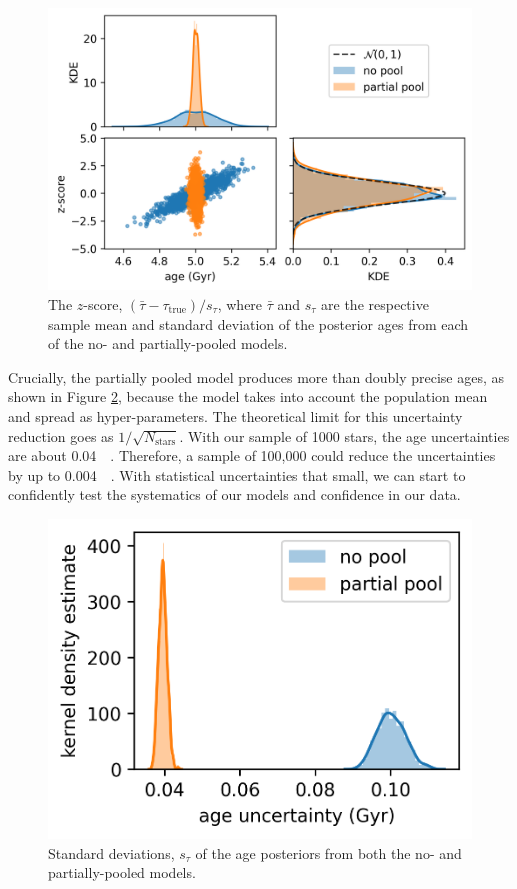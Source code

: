 \begin{figure}[t]
    \centering
    \includegraphics[]{introduction/images/age_z_score.png}
    \caption{The $z$-score, $(\bar{\tau} - \tau_\mathrm{true}) / s_\tau$, where $\bar{\tau}$ and $s_\tau$ are the respective sample mean and standard deviation of the posterior ages from each of the no- and partially-pooled models.}
    \label{fig:zscore}
\end{figure}

Crucially, the partially pooled model produces more than doubly precise ages, as shown in Figure \ref{fig:age_unc}, because the model takes into account the population mean and spread as hyper-parameters. The theoretical limit for this uncertainty reduction goes as $1/\sqrt{N_\mathrm{stars}}$. With our sample of 1000 stars, the age uncertainties are about \SI{0.04}{\giga\year}. Therefore, a sample of 100,000 could reduce the uncertainties by up to \SI{0.004}{\giga\year}. With statistical uncertainties that small, we can start to confidently test the systematics of our models and confidence in our data.
 
\begin{figure}[t]
    \centering
    \includegraphics[]{introduction/images/age_uncertainties.png}
    \caption{Standard deviations, $s_\tau$ of the age posteriors from both the no- and partially-pooled models.}
    \label{fig:age_unc}
\end{figure}

